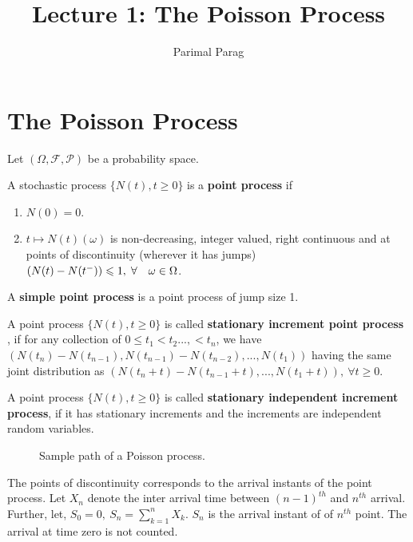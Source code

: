 \documentclass[a4paper,10pt]{article}
\title{Lecture 1: The Poisson Process}
\author{Parimal Parag}
\begin{document}
\maketitle

\section{The Poisson Process}
Let \noindent $(\Omega, \mathcal{F}, \mathcal{P})$ be a probability space.
\begin{defn} A stochastic process $\{N(t), t\geqslant 0\}$ is a \textbf{point process} if
\begin{enumerate}
  \item $N(0) = 0$.
  \item $t\mapsto N(t) (\omega)$ is non-decreasing, integer valued, right continuous and at points of discontinuity (wherever it has jumps) $(N(t)- N(t^{-}))\leqslant 1, \hspace{0.1cm} \forall \quad \omega \in \Omega$. 
\end{enumerate}
\end{defn} 
\begin{defn} A \textbf{simple point process} is a point process of jump size 1.
\end{defn}

\begin{defn} A point process $\{N(t), t\geqslant 0\}$ is called \textbf{stationary increment point process }, if for any collection of $0\leqslant t_{1}<t_{2}...,<t_{n}$, we have $(N(t_{n})-N(t_{n-1}),N(t_{n-1})-N(t_{n-2}),...,N(t_{1}))$ having the same joint distribution as $(N(t_{n}+t)-N(t_{n-1}+t),...,N(t_{1}+t)), ~ \forall t \geqslant 0$.
\end{defn}
\begin{defn}   A point process $\{N(t), t\geqslant 0\}$ is called \textbf{stationary independent increment process}, if it has stationary increments and the increments are independent random variables.
\end{defn}

\begin{figure}[hhhh]
\center
	
	\caption{Sample path of a Poisson process.}
	\label{Fig:Poisson}
\end{figure}
\noindent The points of discontinuity corresponds to the arrival instants of the point process. Let $X_{n}$  denote the inter arrival time between $(n-1)^{th}$ and $n^{th}$ arrival. Further, let, $S_{0}=0,~ S_{n}= \sum^{n}_{k=1}X_{k}$. $S_{n}$ is the arrival instant of of $n^{th}$ point. The arrival at time zero is not counted.
\end{document}
